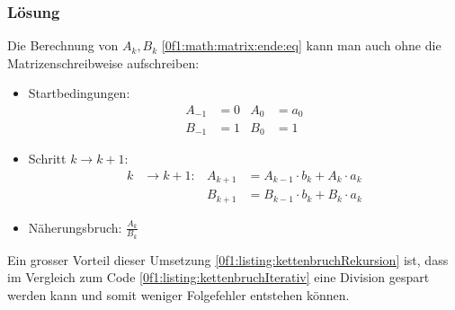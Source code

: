\subsubsection{Lösung}
Die Berechnung von $A_k, B_k$ \eqref{0f1:math:matrix:ende:eq} kann man auch ohne die Matrizenschreibweise aufschreiben: \cite{0f1:wiki-fraction}
\begin{itemize}
\item Startbedingungen:
\begin{align*}
A_{-1} &= 0		&		A_0 &= a_0 \\
B_{-1} &= 1		&		B_0 &= 1 
\end{align*}
\item Schritt $k\to k+1$:
\[
\begin{aligned}
k &\rightarrow k + 1:
&
A_{k+1} &= A_{k-1} \cdot b_k + A_k \cdot a_k \\
&&
B_{k+1} &= B_{k-1} \cdot b_k + B_k \cdot a_k
\end{aligned}
\]
\item
Näherungsbruch: \qquad$\displaystyle\frac{A_k}{B_k}$
\end{itemize}

Ein grosser Vorteil dieser Umsetzung \ref{0f1:listing:kettenbruchRekursion} ist, dass im Vergleich zum Code \ref{0f1:listing:kettenbruchIterativ} eine Division gespart werden kann und somit weniger Folgefehler entstehen können.

